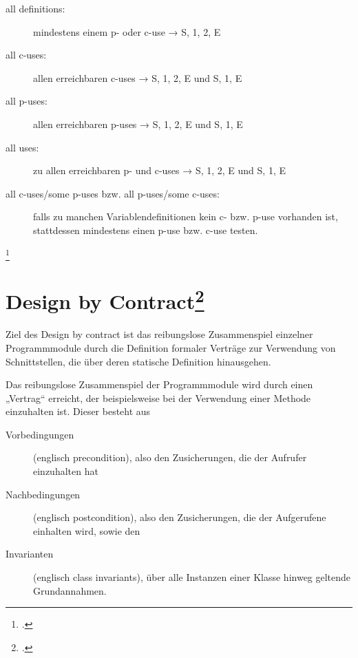 \documentclass{bschlangaul-theorie}
\begin{document}
\begin{description}

\item[all definitions:] mindestens einem p- oder c-use
→ S, 1, 2, E

\item[all c-uses:] allen erreichbaren c-uses
→ S, 1, 2, E und S, 1, E

\item[all p-uses:] allen erreichbaren p-uses
→ S, 1, 2, E und S, 1, E

\item[all uses:] zu allen erreichbaren p- und c-uses
→ S, 1, 2, E und S, 1, E

\item[all c-uses/some p-uses bzw. all p-uses/some c-uses:] falls zu
manchen Variablendefinitionen kein c- bzw. p-use vorhanden ist,
stattdessen mindestens einen p-use bzw. c-use testen.
\end{description}

\footcite[Seite 44]{sosy:fs:5}

%

\section{Design by Contract\footcite{wiki:design-by-contract}}

Ziel des Design by contract ist das reibungslose Zusammenspiel einzelner
Programmmodule durch die Definition formaler Verträge zur Verwendung von
Schnittstellen, die über deren statische Definition hinausgehen.

Das reibungslose Zusammenspiel der Programmmodule wird durch einen
„Vertrag“ erreicht, der beispielsweise bei der Verwendung einer Methode
einzuhalten ist. Dieser besteht aus

\begin{description}
\item[Vorbedingungen] (englisch precondition), also den Zusicherungen,
die der Aufrufer einzuhalten hat

\item[Nachbedingungen] (englisch postcondition), also den Zusicherungen,
die der Aufgerufene einhalten wird, sowie den

\item[Invarianten] (englisch class invariants), über alle Instanzen
einer Klasse hinweg geltende Grundannahmen.
\end{description}
\end{document}

